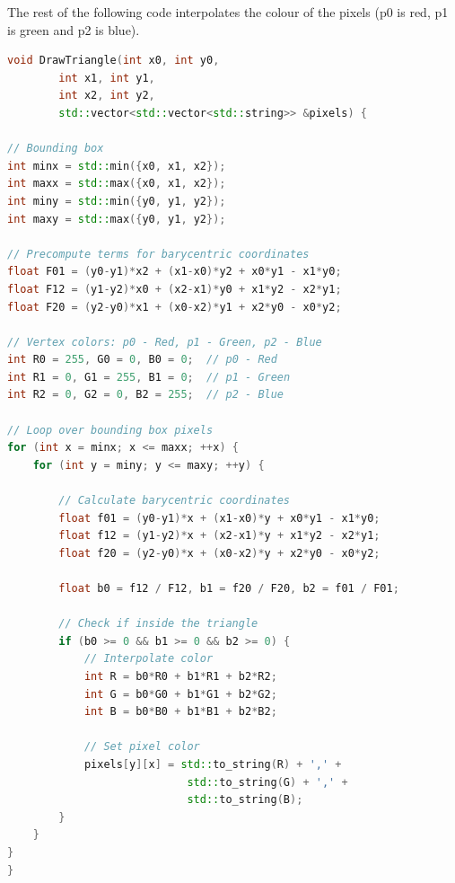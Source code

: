 \documentclass[letterpaper, 8pt]{extarticle}
\begin{document}
\begin{multicols*}{4}
The rest of the following code interpolates the colour of the pixels (p0 is red, p1 is green and p2 is blue).


\begin{lstlisting}[language=C++]
void DrawTriangle(int x0, int y0, 
        int x1, int y1, 
        int x2, int y2, 
        std::vector<std::vector<std::string>> &pixels) {

// Bounding box
int minx = std::min({x0, x1, x2});
int maxx = std::max({x0, x1, x2});
int miny = std::min({y0, y1, y2});
int maxy = std::max({y0, y1, y2});

// Precompute terms for barycentric coordinates
float F01 = (y0-y1)*x2 + (x1-x0)*y2 + x0*y1 - x1*y0;
float F12 = (y1-y2)*x0 + (x2-x1)*y0 + x1*y2 - x2*y1;
float F20 = (y2-y0)*x1 + (x0-x2)*y1 + x2*y0 - x0*y2;

// Vertex colors: p0 - Red, p1 - Green, p2 - Blue
int R0 = 255, G0 = 0, B0 = 0;  // p0 - Red
int R1 = 0, G1 = 255, B1 = 0;  // p1 - Green
int R2 = 0, G2 = 0, B2 = 255;  // p2 - Blue

// Loop over bounding box pixels
for (int x = minx; x <= maxx; ++x) {
    for (int y = miny; y <= maxy; ++y) {

        // Calculate barycentric coordinates
        float f01 = (y0-y1)*x + (x1-x0)*y + x0*y1 - x1*y0;
        float f12 = (y1-y2)*x + (x2-x1)*y + x1*y2 - x2*y1;
        float f20 = (y2-y0)*x + (x0-x2)*y + x2*y0 - x0*y2;

        float b0 = f12 / F12, b1 = f20 / F20, b2 = f01 / F01;

        // Check if inside the triangle
        if (b0 >= 0 && b1 >= 0 && b2 >= 0) {
            // Interpolate color
            int R = b0*R0 + b1*R1 + b2*R2;
            int G = b0*G0 + b1*G1 + b2*G2;
            int B = b0*B0 + b1*B1 + b2*B2;

            // Set pixel color
            pixels[y][x] = std::to_string(R) + ',' +
                            std::to_string(G) + ',' +
                            std::to_string(B);
        }
    }
}
}
\end{lstlisting}


\end{multicols*}
\end{document}
